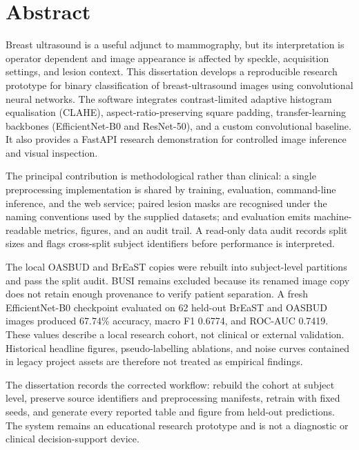 \chapter*{Abstract}

Breast ultrasound is a useful adjunct to mammography, but its interpretation is operator dependent and image appearance is affected by speckle, acquisition settings, and lesion context. This dissertation develops a reproducible research prototype for binary classification of breast-ultrasound images using convolutional neural networks. The software integrates contrast-limited adaptive histogram equalisation (CLAHE), aspect-ratio-preserving square padding, transfer-learning backbones (EfficientNet-B0 and ResNet-50), and a custom convolutional baseline. It also provides a FastAPI research demonstration for controlled image inference and visual inspection.

The principal contribution is methodological rather than clinical: a single preprocessing implementation is shared by training, evaluation, command-line inference, and the web service; paired lesion masks are recognised under the naming conventions used by the supplied datasets; and evaluation emits machine-readable metrics, figures, and an audit trail. A read-only data audit records split sizes and flags cross-split subject identifiers before performance is interpreted.

The local OASBUD and BrEaST copies were rebuilt into subject-level partitions and pass the split audit. BUSI remains excluded because its renamed image copy does not retain enough provenance to verify patient separation. A fresh EfficientNet-B0 checkpoint evaluated on 62 held-out BrEaST and OASBUD images produced 67.74\% accuracy, macro F1 0.6774, and ROC-AUC 0.7419. These values describe a local research cohort, not clinical or external validation. Historical headline figures, pseudo-labelling ablations, and noise curves contained in legacy project assets are therefore not treated as empirical findings.

The dissertation records the corrected workflow: rebuild the cohort at subject level, preserve source identifiers and preprocessing manifests, retrain with fixed seeds, and generate every reported table and figure from held-out predictions. The system remains an educational research prototype and is not a diagnostic or clinical decision-support device.
